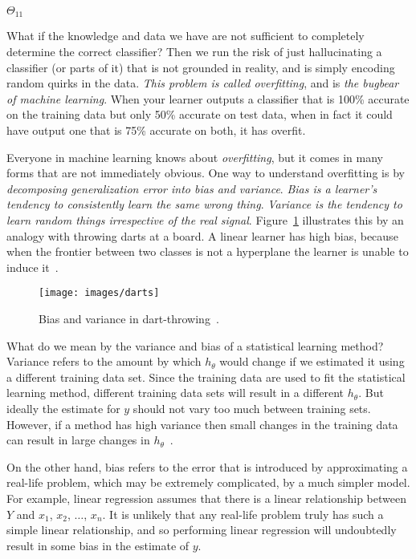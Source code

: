 \documentclass[12pt]{article}
\begin{document}
$\Theta_{11}$


What if the knowledge and data we have are not sufficient to completely determine the correct classifier? Then we run the risk of just hallucinating a classifier (or parts of it) that is not grounded in reality, and is simply encoding random quirks in the data. \textit{This problem is called overfitting}, and is \textit{the bugbear of machine learning}.
When your learner outputs a classifier that is 100\% accurate on the training data but only 50\% accurate on test data, when in fact it could have output one that is 75\% accurate on both, it has overfit.

Everyone in machine learning knows about \textit{overfitting}, but it comes in many forms that are not immediately obvious. One way to understand overfitting is by \textit{decomposing generalization error into bias and variance}.  \textit{Bias is a learner's tendency to consistently learn the same wrong thing}. \textit{Variance is the tendency to learn random things irrespective of the real signal}. Figure~\ref{fig:darts} illustrates this by an analogy with throwing darts at a board. A linear learner has high bias, because when the frontier between two classes is not a hyperplane the learner is unable to induce it~\citep{domingos2012few}.

\begin{figure}[!ht]
	\centering
	\texttt{[image: images/darts]}
	\caption{Bias and variance in dart-throwing~\citep{domingos2012few}.}
	\label{fig:darts}
\end{figure}

What do we mean by the variance and bias of a statistical learning method? Variance refers to the amount by which $h_\theta$ would change if we estimated it using a different training data set. Since the training data
are used to fit the statistical learning method, different training data sets will result in a different $h_\theta$. But ideally the estimate for $y$ should not vary too much between training sets. However, if a method has high variance
then small changes in the training data can result in large changes in $h_\theta$~\citep{james2013introduction}.

On the other hand, bias refers to the error that is introduced by approximating a real-life problem, which may be extremely complicated, by a much simpler model. For example, linear regression assumes that there is a linear
relationship between $Y$ and $x_1$, $x_2$, $\ldots$, $x_n$. It is unlikely that any real-life problem truly has such a simple linear relationship, and so performing linear regression will undoubtedly result in some bias in the estimate of $y$.




\end{document}
